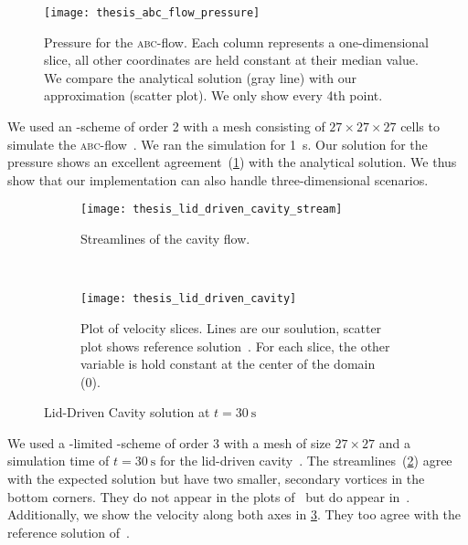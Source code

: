 \begin{figure}[htb]
  \centering
  \texttt{[image: thesis\_abc\_flow\_pressure]}
  \caption{\label{fig:abc-result}%
  Pressure for the \textsc{abc}-flow.
  Each column represents a one-dimensional slice, all other coordinates are held constant at their median value.
  We compare the analytical solution (gray line) with our approximation (scatter plot).
  We only show every 4th point.}
\end{figure}
We used an \aderdg{}-scheme of order 2 with a mesh consisting of $27 \times 27 \times 27$ cells to simulate the \textsc{abc}-flow~.
We ran the simulation for \SI{1}{\s}.
Our solution for the pressure shows an excellent agreement~(\cref{fig:abc-result}) with the analytical solution.
We thus show that our implementation can also handle three-dimensional scenarios.

\begin{figure}[htb]
  \centering
  \begin{subfigure}[t]{0.5\textwidth}
    \centering
    \texttt{[image: thesis\_lid\_driven\_cavity\_stream]}
    \caption{\label{fig:lid-driven-cavity-streamlines}%
      Streamlines of the cavity flow.}
  \end{subfigure}~%
  \begin{subfigure}[t]{0.5\textwidth}
    \centering
    \texttt{[image: thesis\_lid\_driven\_cavity]}
    \caption{\label{fig:lid-driven-cavity-result}%
      Plot of velocity slices. Lines are our soulution, scatter plot shows reference solution~\cite{ghia1982high}.
      For each slice, the other variable is hold constant at the center of the domain (0).}
  \end{subfigure}
  
  \caption{\label{fig:lid-driven-cavity}%
    Lid-Driven Cavity solution at $t=\SI{30}{\s}$}
  
\end{figure}
We used a \muscl{}-limited \aderdg{}-scheme of order 3 with a mesh of size $27 \times 27$ and a simulation time of $t = \SI{30}{\s}$ for the lid-driven cavity~.
The streamlines~(\cref{fig:lid-driven-cavity-streamlines}) agree with the expected solution but have two smaller, secondary vortices in the bottom corners.
They do not appear in the plots of~\cite{dumbser2010arbitrary} but do appear in~\cite{ghia1982high}.
Additionally, we show the velocity along both axes in \cref{fig:lid-driven-cavity-result}.
They too agree with the reference solution of~\cite{ghia1982high}.

